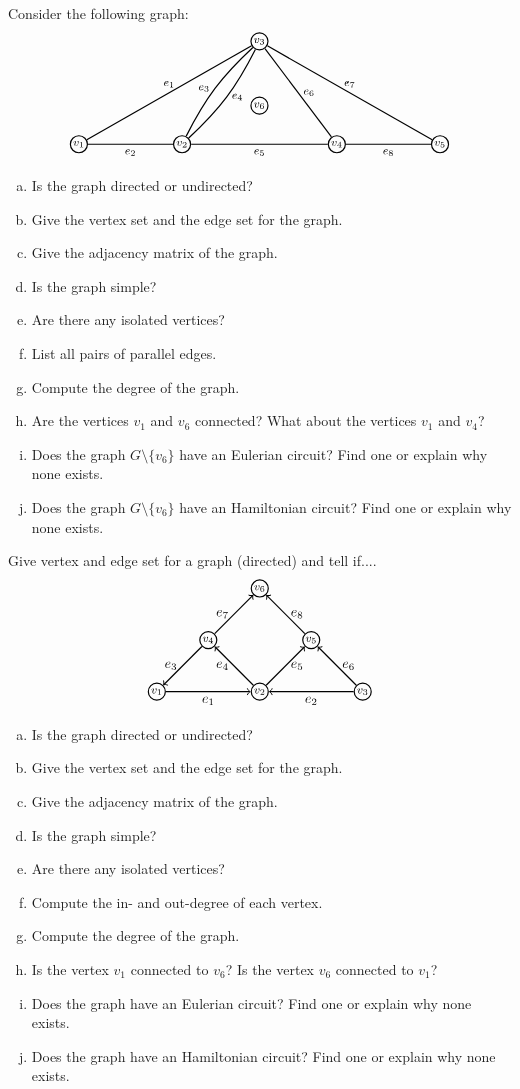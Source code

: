 \documentclass[11pt,letterpaper]{article}
\begin{document}
\homework{}

 Consider the following graph:
	\[
	\graphOne
	\]

\begin{enumerate}[(a)]
\item Is the graph directed or undirected?
\item Give the vertex set and the edge set for the graph.
\item Give the adjacency matrix of the graph.
\item Is the graph simple?
\item Are there any isolated vertices?
\item List all pairs of parallel edges.
\item Compute the degree of the graph.  
\item Are the vertices $v_1$ and $v_6$ connected? What about the vertices $v_1$ and $v_4$? 
\item Does the graph $G \setminus \{ v_6 \}$ have an Eulerian circuit? Find one or explain why none exists.  
\item Does the graph $G \setminus \{ v_6 \}$ have an Hamiltonian circuit? Find one or explain why none exists.  
\end{enumerate} \pspace





\newpage





 Give vertex and edge set for a graph (directed) and tell if....
	\[
	\graphTwo
	\]

\begin{enumerate}[(a)]
\item Is the graph directed or undirected?
\item Give the vertex set and the edge set for the graph.
\item Give the adjacency matrix of the graph.
\item Is the graph simple?
\item Are there any isolated vertices?
\item Compute the in- and out-degree of each vertex. 
\item Compute the degree of the graph.
\item Is the vertex $v_1$ connected to $v_6$? Is the vertex $v_6$ connected to $v_1$?
\item Does the graph have an Eulerian circuit? Find one or explain why none exists.  
\item Does the graph have an Hamiltonian circuit? Find one or explain why none exists.  
\end{enumerate}
\end{document}
